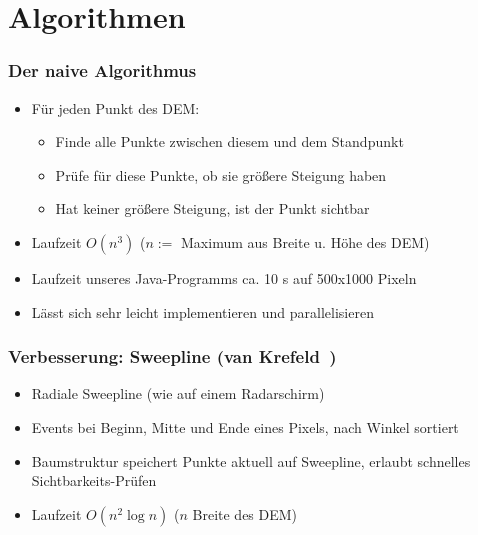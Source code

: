 \documentclass{beamer}
\begin{document}
\section{Algorithmen}

\begin{frame}
  \frametitle{Der naive Algorithmus}
  \begin{itemize}
    \item Für jeden Punkt des DEM:
    \begin{itemize}
      \item Finde alle Punkte zwischen diesem und dem Standpunkt
      \item Prüfe für diese Punkte, ob sie größere Steigung haben
      \item Hat keiner größere Steigung, ist der Punkt sichtbar
    \end{itemize}
    \item<2-> Laufzeit $O(n^3)$ ($n :=$ Maximum aus Breite u. Höhe des DEM)
    \item<3-> Laufzeit unseres Java-Programms ca. 10 s auf 500x1000 Pixeln
    \item<4-> Lässt sich sehr leicht implementieren und parallelisieren
  \end{itemize}
\end{frame}


\begin{frame}
  \frametitle{Verbesserung: Sweepline (van Krefeld~\cite{van1996variations})}
  \begin{itemize}
    \item Radiale Sweepline (wie auf einem Radarschirm)
    \item Events bei Beginn, Mitte und Ende eines Pixels, nach Winkel sortiert
    \item Baumstruktur speichert Punkte aktuell auf Sweepline, erlaubt schnelles Sichtbarkeits-Prüfen
    \item<2-> Laufzeit $O(n^2 \log{n})$ ($n$ Breite des DEM)
  \end{itemize}
\end{frame}
\end{document}
